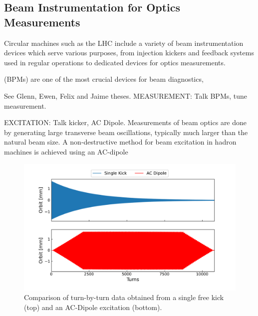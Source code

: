 
\subsection{Beam Instrumentation for Optics Measurements}

Circular machines such as the LHC include a variety of beam instrumentation devices which serve various purposes, from injection kickers and feedback systems used in regular operations to dedicated devices for optics measurements.

 (BPMs) are one of the most crucial devices for beam diagnostics, 

See Glenn, Ewen, Felix and Jaime theses.
MEASUREMENT: Talk BPMs, tune measurement.

EXCITATION: Talk kicker, AC Dipole.
Measurements of beam optics are done by generating large transverse beam oscillations, typically much larger than the natural beam size.
A non-destructive method for beam excitation in hadron machines is achieved using an AC-dipole

\begin{figure}[!htb]
  \centering
  \includegraphics*[width=0.99\linewidth]{Figures/Optics_Measurements_Corrections_at_LHC/kick_vs_acdipole.pdf}
  \caption{Comparison of turn-by-turn data obtained from a single free kick (top) and an AC-Dipole excitation (bottom).}
  \label{figure:kick_vs_acdipole_tbt}
\end{figure}

